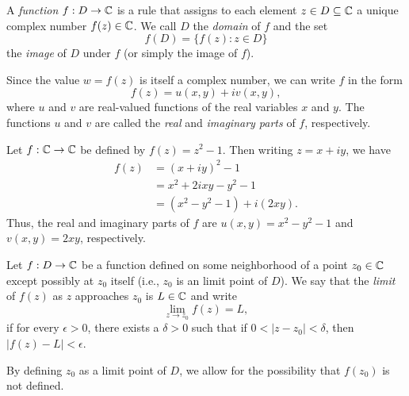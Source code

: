 \begin{definition}
    A \emph{function} \(f : D \to \mathbb{C}\) is a rule that assigns to each element \(z \in D \subseteq \mathbb{C}\) a unique complex number \(f(z) \in \mathbb{C}\). We call \(D\) the \emph{domain} of \(f\) and the set
    \[
        f(D) = \{f(z) : z \in D\}
    \]
    the \emph{image} of \(D\) under \(f\) (or simply the image of \(f\)).
    \label{def:complex-function}
\end{definition}

Since the value \(w = f(z)\) is itself a complex number, we can write \(f\) in the form
\[
    f(z) = u(x, y) + iv(x, y),
\]
where \(u\) and \(v\) are real-valued functions of the real variables \(x\) and \(y\). The functions \(u\) and \(v\) are called the \emph{real} and \emph{imaginary parts} of \(f\), respectively.

\begin{example}
    Let \(f : \mathbb{C} \to \mathbb{C}\) be defined by \(f(z) = z^2 - 1\). Then writing \(z = x + iy\), we have
    \[
        \begin{aligned}
            f(z) &= (x + iy)^2 - 1 \\
            &= x^2 + 2ixy - y^2 - 1 \\
            &= (x^2 - y^2 - 1) + i(2xy).
        \end{aligned}
    \]
    Thus, the real and imaginary parts of \(f\) are \(u(x, y) = x^2 - y^2 - 1\) and \(v(x, y) = 2xy\), respectively.
\end{example}

\begin{definition}
    Let \(f : D \to \mathbb{C}\) be a function defined on some neighborhood of a point \(z_0 \in \mathbb{C}\) except possibly at \(z_0\) itself (i.e., \(z_0\) is an limit point of \(D\)). We say that the \emph{limit} of \(f(z)\) as \(z\) approaches \(z_0\) is \(L \in \mathbb{C}\) and write
    \[
        \lim_{z \to z_0} f(z) = L,
    \]
    if for every \(\epsilon > 0\), there exists a \(\delta > 0\) such that if \(0 < |z - z_0| < \delta\), then \(|f(z) - L| < \epsilon\).
    \label{def:limit}
\end{definition}

By defining \(z_0\) as a limit point of \(D\), we allow for the possibility that \(f(z_0)\) is not defined.

